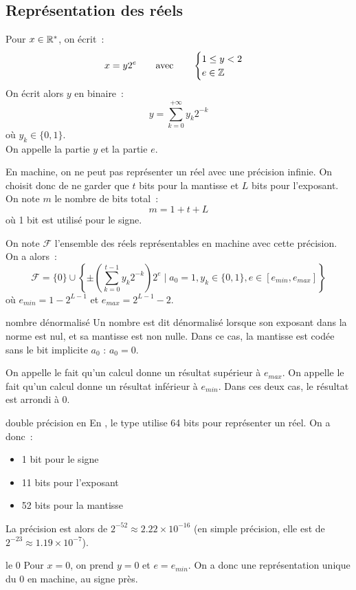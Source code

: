 \subsection{Représentation des réels}
Pour $x \in \mathbb{R}^*$, on écrit~:
$$x = y2^e \qquad \text{avec}\qquad \begin{cases}
    1 \leq y < 2\\
    e \in \mathbb{Z}
\end{cases}$$
On écrit alors $y$ en binaire~:
$$y = \sum_{k=0}^{+\infty} y_k 2^{-k}$$
où $y_k \in \{0,1\}$.\\
On appelle  la partie $y$ et  la partie $e$.\\\par
En machine, on ne peut pas représenter un réel avec une précision infinie. On choisit donc de ne garder que $t$ bits pour la mantisse et $L$ bits pour l'exposant.\\
On note $m$ le nombre de bits total~:
$$m = 1 + t + L$$
où 1 bit est utilisé pour le signe.\\\par
On note $\mathcal{F}$ l'ensemble des réels représentables en machine avec cette précision. On a alors~:
$$\mathcal{F} = \{0\} \cup \left\{ \pm \left(\sum_{k=0}^{t-1} y_k 2^{-k}\right) 2^e \mid a_0 = 1, y_k \in \{0,1\}, e \in [e_{min}, e_{max}] \right\}$$
où $e_{min} = 1 - 2^{L-1}$ et $e_{max} = 2^{L-1} - 2$.\\\par
\begin{definition}{}{nombre dénormalisé}
    Un nombre est dit dénormalisé lorsque son exposant dans la norme  est nul, et sa mantisse est non nulle. Dans ce cas, la mantisse est codée sans le bit implicite $a_0$ : $a_0 = 0$.
\end{definition}
On appelle  le fait qu'un calcul donne un résultat supérieur à $e_{max}$. On appelle  le fait qu'un calcul donne un résultat inférieur à $e_{min}$. Dans ces deux cas, le résultat est arrondi à $0$.

\begin{exemple}{}{double précision en }
En , le type  utilise 64 bits pour représenter un réel. On a donc~:
\begin{itemize}
    \item 1 bit pour le signe
    \item 11 bits pour l'exposant
    \item 52 bits pour la mantisse
\end{itemize}
La précision est alors de $2^{-52} \approx 2.22 \times 10^{-16}$ (en simple précision, elle est de $2^{-23} \approx 1.19 \times 10^{-7}$).\\
\end{exemple}
\begin{remarque}{}{le 0}
    Pour $x=0$, on prend $y=0$ et $e=e_{min}$. On a donc une représentation unique du 0 en machine, au signe près.
\end{remarque}


